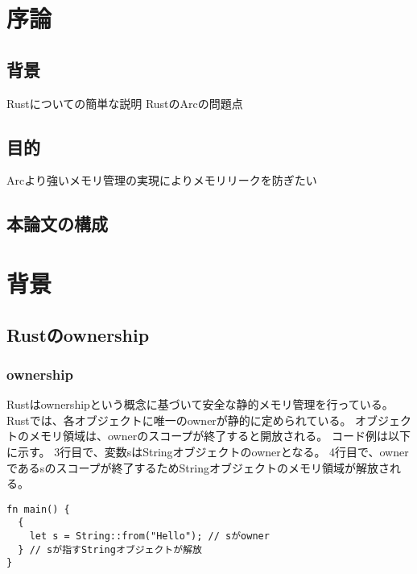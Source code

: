 \documentclass{sumiilab-paper}
\theoremstyle{mystyle}
\numberwithin{definition}{chapter} %
\begin{document}
\begin{abstract}
\end{abstract}

\tableofcontents%

\mainmatter%

\chapter{序論}

\section{背景}
Rustについての簡単な説明
RustのArcの問題点

\section{目的}
Arcより強いメモリ管理の実現によりメモリリークを防ぎたい

\section{本論文の構成}


\chapter{背景}

\section{Rustのownership}

\subsection{ownership}
Rustはownershipという概念に基づいて安全な静的メモリ管理を行っている。
Rustでは、各オブジェクトに唯一のownerが静的に定められている。
オブジェクトのメモリ領域は、ownerのスコープが終了すると開放される。
コード例は以下に示す。
3行目で、変数sはStringオブジェクトのownerとなる。
4行目で、ownerであるsのスコープが終了するためStringオブジェクトのメモリ領域が解放される。
\begin{lstlisting}
fn main() {
  {
    let s = String::from("Hello"); // sがowner
  } // sが指すStringオブジェクトが解放
}
\end{lstlisting}
\end{document}
